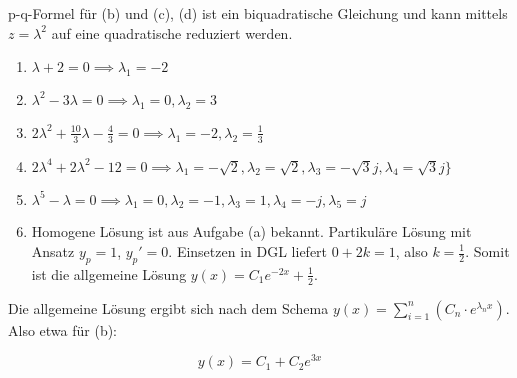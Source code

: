 \item p-q-Formel für (b) und (c), (d) ist ein biquadratische Gleichung und kann mittels $z = \lambda^2$ auf eine quadratische reduziert werden.

\begin{enumerate}
\item $\lambda + 2 = 0 \implies \lambda_1 = -2$
\item $\lambda^2-3\lambda=0 \implies \lambda_1 = 0, \lambda_2 = 3$
\item $2\lambda^2+\frac{10}{3}\lambda-\frac{4}{3}=0 \implies \lambda_1 = -2, \lambda_2 = \frac{1}{3}$
\item $2\lambda^4+2\lambda^2-12=0 \implies \lambda_1=-\sqrt{2}, \lambda_2=\sqrt{2}, \lambda_3=-\sqrt{3}j, \lambda_4=\sqrt{3}j \rbrace$
\item $\lambda^5-\lambda = 0 \implies \lambda_1 = 0, \lambda_2 = -1, \lambda_3 = 1, \lambda_4 = -j, \lambda_5 = j$
\item Homogene Lösung ist aus Aufgabe (a) bekannt. Partikuläre Lösung mit Ansatz $y_p=1$, $y_p'=0$. Einsetzen in DGL liefert $0+2k=1$, also $k=\frac{1}{2}$. Somit ist die allgemeine Lösung $y(x) = C_1 e^{-2x} + \frac{1}{2}$. 
\end{enumerate}

Die allgemeine Lösung ergibt sich nach dem Schema $y(x) = \sum\limits_{i=1}^{n} \left( C_n \cdot e^{\lambda_n x} \right)$. Also etwa für (b):

$$ y(x) = C_1 + C_2 e^{3x}$$

